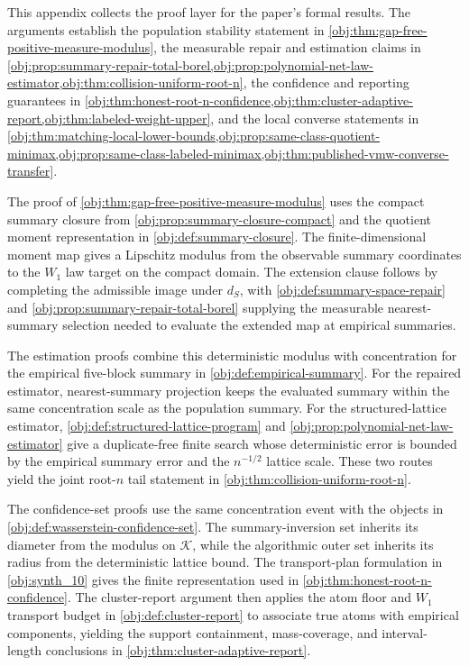 \documentclass[11pt]{article}
\begin{document}
This appendix collects the proof layer for the paper's formal results. The arguments establish the population stability statement in \cref{obj:thm:gap-free-positive-measure-modulus}, the measurable repair and estimation claims in \cref{obj:prop:summary-repair-total-borel,obj:prop:polynomial-net-law-estimator,obj:thm:collision-uniform-root-n}, the confidence and reporting guarantees in \cref{obj:thm:honest-root-n-confidence,obj:thm:cluster-adaptive-report,obj:thm:labeled-weight-upper}, and the local converse statements in \cref{obj:thm:matching-local-lower-bounds,obj:prop:same-class-quotient-minimax,obj:prop:same-class-labeled-minimax,obj:thm:published-vmw-converse-transfer}.

The proof of \cref{obj:thm:gap-free-positive-measure-modulus} uses the compact summary closure from \cref{obj:prop:summary-closure-compact} and the quotient moment representation in \cref{obj:def:summary-closure}. The finite-dimensional moment map gives a Lipschitz modulus from the observable summary coordinates to the \(W_1\) law target on the compact domain. The extension clause follows by completing the admissible image under \(d_S\), with \cref{obj:def:summary-space-repair} and \cref{obj:prop:summary-repair-total-borel} supplying the measurable nearest-summary selection needed to evaluate the extended map at empirical summaries.

The estimation proofs combine this deterministic modulus with concentration for the empirical five-block summary in \cref{obj:def:empirical-summary}. For the repaired estimator, nearest-summary projection keeps the evaluated summary within the same concentration scale as the population summary. For the structured-lattice estimator, \cref{obj:def:structured-lattice-program} and \cref{obj:prop:polynomial-net-law-estimator} give a duplicate-free finite search whose deterministic error is bounded by the empirical summary error and the \(n^{-1/2}\) lattice scale. These two routes yield the joint root-\(n\) tail statement in \cref{obj:thm:collision-uniform-root-n}.

The confidence-set proofs use the same concentration event with the objects in \cref{obj:def:wasserstein-confidence-set}. The summary-inversion set inherits its diameter from the modulus on \(\mathcal K\), while the algorithmic outer set inherits its radius from the deterministic lattice bound. The transport-plan formulation in \cref{obj:synth_10} gives the finite representation used in \cref{obj:thm:honest-root-n-confidence}. The cluster-report argument then applies the atom floor and \(W_1\) transport budget in \cref{obj:def:cluster-report} to associate true atoms with empirical components, yielding the support containment, mass-coverage, and interval-length conclusions in \cref{obj:thm:cluster-adaptive-report}.
\end{document}
